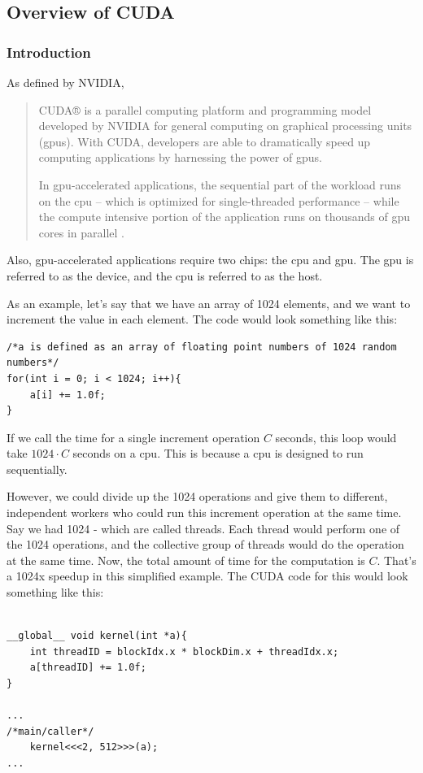 
\subsection{Overview of CUDA}
\subsubsection{Introduction}
As defined by NVIDIA, \begin{quote}
CUDA® is a parallel computing platform and programming model developed by NVIDIA for general computing on graphical processing units (\gls{gpu}s). With CUDA, developers are able to dramatically speed up computing applications by harnessing the power of \gls{gpu}s.

In \gls{gpu}-accelerated applications, the sequential part of the workload runs on the \gls{cpu} – which is optimized for single-threaded performance – while the compute intensive portion of the application runs on thousands of \gls{gpu} cores in parallel  \citep{nvidia_accelerated_computing_2018}.
\end{quote}
Also, \gls{gpu}-accelerated applications require two chips: the \gls{cpu} and \gls{gpu}. The \gls{gpu} is referred to as the device, and the \gls{cpu} is referred to as the host. 


As an example, let's say that we have an array of 1024 elements, and we want to increment the value in each element. The code would look something like this:

\begin{verbatim}
/*a is defined as an array of floating point numbers of 1024 random numbers*/
for(int i = 0; i < 1024; i++){
    a[i] += 1.0f;
}
\end{verbatim}
If we call the time for a single increment operation $C$ seconds, this loop would take $1024 \cdot C$ seconds on a \gls{cpu}. This is because a \gls{cpu} is designed to run sequentially.

However, we could divide up the 1024 operations and give them to different, independent workers who could run this increment operation at the same time. Say we had 1024  - which are called threads. Each thread would perform one of the 1024 operations, and the collective group of threads would do the operation at the same time. Now, the total amount of time for the computation is $C$. That's a 1024x speedup in this simplified example. The CUDA code for this would look something like this:

\begin{verbatim}

__global__ void kernel(int *a){
    int threadID = blockIdx.x * blockDim.x + threadIdx.x;
    a[threadID] += 1.0f;
}

...
/*main/caller*/
    kernel<<<2, 512>>>(a);
...
\end{verbatim}
